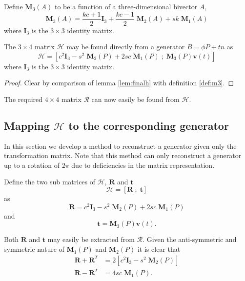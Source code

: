 \begin{definition}
\label{def:m3}
Define $\mathbf{M}_3(A)$ to be a function of a three-dimensional bivector $A$,
\[
\mathbf{M}_3(A) = \frac{kc+1}{2} \mathbf{I}_3 
+ \frac{kc-1}{2} \;\mathbf{M}_2(A) + sk\;\mathbf{M}_1(A)
\]
where  $\mathbf{I}_3$ is the $3\times3$ identity matrix.
\end{definition}

\begin{thm}
The $3\times4$ matrix $\mathcal{H}$ may be found directly from a
generator $B=\phi P + tn$ as
\[
\mathcal{H} = \left[
 c^2\mathbf{I}_3 - s^2\;\mathbf{M}_2(P) + 2sc\;\mathbf{M}_1(P) \; ; \;
 \mathbf{M}_3(P)\mathbf{v}(t)
\right]
\]
where  $\mathbf{I}_3$ is the $3\times3$ identity matrix.
\begin{proof}
Clear by comparison of lemma \ref{lem:finalh} with definition \ref{def:m3}.
\end{proof}
\end{thm}

\noindent The required $4\times4$ matrix $\mathcal{R}$ can now easily be found from $\mathcal{H}$.

\subsection{Mapping $\mathcal{H}$ to the corresponding generator}

In this section we develop a method to reconstruct a generator given only the
transformation matrix. Note that this method can only reconstruct a generator
up to a rotation of $2\pi$ due to deficiencies in the matrix representation.

\begin{definition}
Define the two sub matrices of $\mathcal{H}$,
$\mathbf{R}$ and $\mathbf{t}$
\[
\mathcal{H} = [ \mathbf{R}\; ; \; \mathbf{t} ]
\]
as 
\begin{equation}
\mathbf{R} = c^2\mathbf{I}_3 - s^2\;\mathbf{M}_2(P) + 2sc\;\mathbf{M}_1(P)\label{eqn:A}
\end{equation}
and
\begin{equation}
\mathbf{t} = \mathbf{M}_3(P)\mathbf{v}(t). \label{eqn:b}
\end{equation}
\end{definition}

Both $\mathbf{R}$ and $\mathbf{t}$ may easily be extracted from $\mathcal{R}$.
Given the anti-symmetric and symmetric nature
of $\mathbf{M}_1(P)$ and $\mathbf{M}_2(P)$ it is clear that
\begin{align*}
\mathbf{R} + \mathbf{R}^T &= 
2\left[ c^2\mathbf{I}_3 - s^2\;\mathbf{M}_2(P) \right] \\
\mathbf{R} - \mathbf{R}^T &= 
4sc\;\mathbf{M}_1(P).
\end{align*} 

